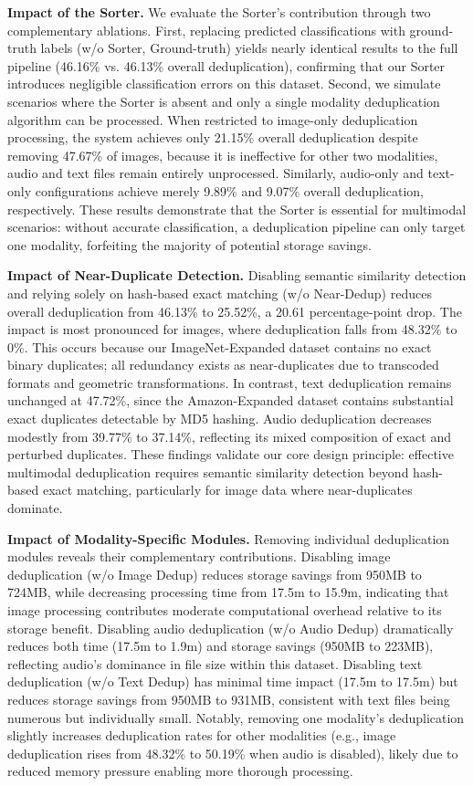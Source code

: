 \documentclass[conference]{IEEEtran}
\begin{document}
\textbf{Impact of the Sorter.} We evaluate the Sorter's contribution through two complementary ablations. First, replacing predicted classifications with ground-truth labels (w/o Sorter, Ground-truth) yields nearly identical results to the full pipeline (46.16\% vs. 46.13\% overall deduplication), confirming that our Sorter introduces negligible classification errors on this dataset. Second, we simulate scenarios where the Sorter is absent and only a single modality deduplication algorithm can be processed. When restricted to image-only deduplication processing, the system achieves only 21.15\% overall deduplication despite removing 47.67\% of images, because it is ineffective for other two modalities, audio and text files remain entirely unprocessed. Similarly, audio-only and text-only configurations achieve merely 9.89\% and 9.07\% overall deduplication, respectively. These results demonstrate that the Sorter is essential for multimodal scenarios: without accurate classification, a deduplication pipeline can only target one modality, forfeiting the majority of potential storage savings.

\textbf{Impact of Near-Duplicate Detection.} Disabling semantic similarity detection and relying solely on hash-based exact matching (w/o Near-Dedup) reduces overall deduplication from 46.13\% to 25.52\%, a 20.61 percentage-point drop. The impact is most pronounced for images, where deduplication falls from 48.32\% to 0\%. This occurs because our ImageNet-Expanded dataset contains no exact binary duplicates; all redundancy exists as near-duplicates due to transcoded formats and geometric transformations. In contrast, text deduplication remains unchanged at 47.72\%, since the Amazon-Expanded dataset contains substantial exact duplicates detectable by MD5 hashing. Audio deduplication decreases modestly from 39.77\% to 37.14\%, reflecting its mixed composition of exact and perturbed duplicates. These findings validate our core design principle: effective multimodal deduplication requires semantic similarity detection beyond hash-based exact matching, particularly for image data where near-duplicates dominate.

\textbf{Impact of Modality-Specific Modules.} Removing individual deduplication modules reveals their complementary contributions. Disabling image deduplication (w/o Image Dedup) reduces storage savings from 950MB to 724MB, while decreasing processing time from 17.5m to 15.9m, indicating that image processing contributes moderate computational overhead relative to its storage benefit. Disabling audio deduplication (w/o Audio Dedup) dramatically reduces both time (17.5m to 1.9m) and storage savings (950MB to 223MB), reflecting audio's dominance in file size within this dataset. Disabling text deduplication (w/o Text Dedup) has minimal time impact (17.5m to 17.5m) but reduces storage savings from 950MB to 931MB, consistent with text files being numerous but individually small. Notably, removing one modality's deduplication slightly increases deduplication rates for other modalities (e.g., image deduplication rises from 48.32\% to 50.19\% when audio is disabled), likely due to reduced memory pressure enabling more thorough processing.
\end{document}
